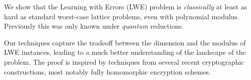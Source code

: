 We show that the Learning with Errors (LWE) problem is \emph{classically} at least as hard as standard worst-case lattice problems, even with polynomial modulus. 
Previously this was only known under \emph{quantum} reductions.

Our techniques capture the tradeoff between the dimension and the modulus of LWE instances, leading to a much better understanding of the
landscape of the problem. The proof is inspired by techniques from
several recent cryptographic constructions, most notably fully
homomorphic encryption schemes.




